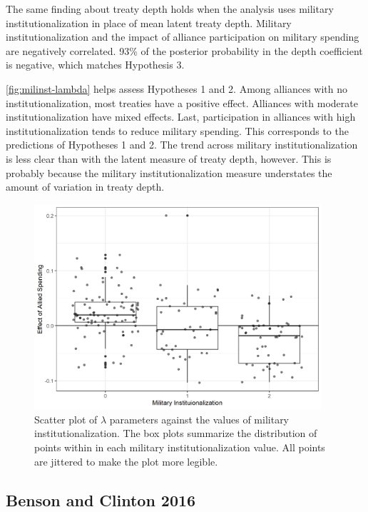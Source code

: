 \documentclass[12pt]{article}
\begin{document}
The same finding about treaty depth holds when the analysis uses military institutionalization in place of mean latent treaty depth. 
Military institutionalization and the impact of alliance participation on military spending are negatively correlated. 
93\% of the posterior probability in the depth coefficient is negative, which matches Hypothesis 3. 


\autoref{fig:milinst-lambda} helps assess Hypotheses 1 and 2. 
Among alliances with no institutionalization, most treaties have a positive effect. 
Alliances with moderate institutionalization have mixed effects. 
Last, participation in alliances with high institutionalization tends to reduce military spending. 
This corresponds to the predictions of Hypotheses 1 and 2. 
The trend across military institutionalization is less clear than with the latent measure of treaty depth, however.
This is probably because the military institutionalization measure understates the amount of variation in treaty depth.  


\begin{figure}[htbp]
	\centering
		\includegraphics[width=0.95\textwidth]{milinst-lambda.png}
	\caption{Scatter plot of $\lambda$ parameters against the values of military institutionalization. The box plots summarize the distribution of points within in each military institutionalization value. All points are jittered to make the plot more legible.}
	\label{fig:milinst-lambda}
\end{figure}



\subsection{Benson and Clinton 2016}
\end{document}

